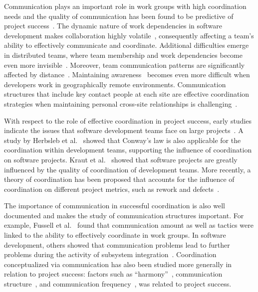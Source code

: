 Communication plays an important role in work groups with high coordination needs
and the quality of communication has been found to be predictive of project
success~\cite{curtis:acm:1988,kraut:1995coordination}. The dynamic nature
of work dependencies in software development makes collaboration highly
volatile~\cite{Cataldo:2007hb}, consequently affecting a team's ability to
effectively communicate and coordinate. Additional difficulties emerge in
distributed teams, where team membership and work dependencies become even more
invisible~\cite{damian:icgse:2007}. Moreover, team communication patterns are
significantly affected by distance~\cite{hinds:cscw:2006}. Maintaining
awareness~\cite{sarma:2006icgse} becomes even more difficult when developers work
in geographically remote environments. Communication structures that include key
contact people at each site are effective coordination strategies when
maintaining personal cross-site relationships is challenging~\cite{hinds:cscw:2006}.

With respect to the role of effective coordination in project success, early
studies indicate the issues that software development teams face on large
projects~\cite{curtis:acm:1988}. A study by Herbsleb et
al.~\cite{Herbsleb:1999ew} showed that Conway's law is also applicable for the
coordination within development teams, supporting the influence of coordination
on software projects. Kraut et al.~\cite{kraut:1995coordination} showed that
software projects are greatly influenced by the quality of coordination of
development teams. More recently, a theory of coordination has been proposed that
accounts for the influence of coordination on different project metrics, such as
rework and defects~\cite{Herbsleb:2006vn}.

The importance of communication in successful coordination is also well
documented and makes the study of communication structures important. For
example, Fussell et al.~\cite{fussell:cscw:1998} found that communication amount as well as
tactics were linked to the ability to effectively coordinate in work groups. In
software development, others showed that communication problems lead to further problems
during the activity of subsystem
integration~\cite{Grinter:1999geography,deSouza2004:thwarts_collaboration}. Coordination
conceptualized via communication has also been studied more generally in relation
to project success: factors such as ``harmony''~\cite{Souder:1988jpim},
communication structure~\cite{Robin:1990jpim}, and communication
frequency~\cite{Griffin:1992ms}, was related to project success.

